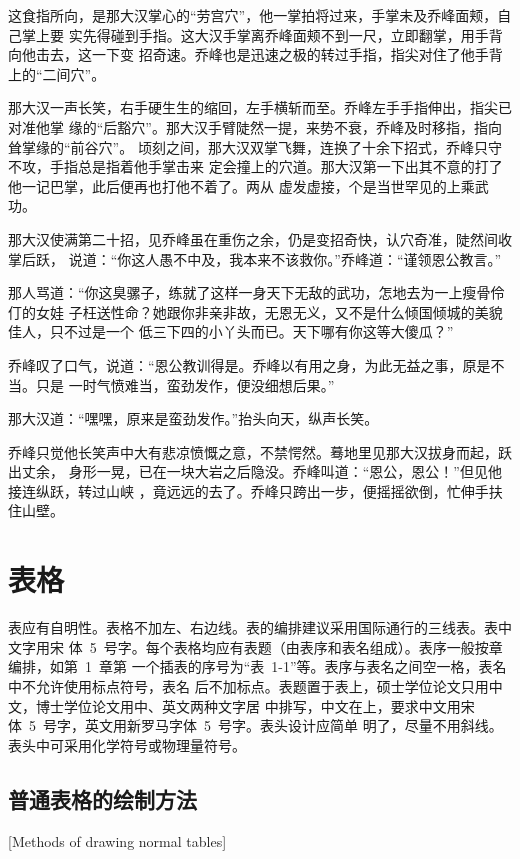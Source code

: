 这食指所向，是那大汉掌心的“劳宫穴”，他一掌拍将过来，手掌未及乔峰面颊，自己掌上要
实先得碰到手指。这大汉手掌离乔峰面颊不到一尺，立即翻掌，用手背向他击去，这一下变
招奇速。乔峰也是迅速之极的转过手指，指尖对住了他手背上的“二间穴”。

那大汉一声长笑，右手硬生生的缩回，左手横斩而至。乔峰左手手指伸出，指尖已对准他掌
缘的“后豁穴”。那大汉手臂陡然一提，来势不衰，乔峰及时移指，指向耸掌缘的“前谷穴”。
顷刻之间，那大汉双掌飞舞，连换了十余下招式，乔峰只守不攻，手指总是指着他手掌击来
定会撞上的穴道。那大汉第一下出其不意的打了他一记巴掌，此后便再也打他不着了。两从
虚发虚接，个是当世罕见的上乘武功。

那大汉使满第二十招，见乔峰虽在重伤之余，仍是变招奇快，认穴奇准，陡然间收掌后跃，
说道：“你这人愚不中及，我本来不该救你。”乔峰道：“谨领恩公教言。”

那人骂道：“你这臭骡子，练就了这样一身天下无敌的武功，怎地去为一上瘦骨伶仃的女娃
子枉送性命？她跟你非亲非故，无恩无义，又不是什么倾国倾城的美貌佳人，只不过是一个
低三下四的小丫头而已。天下哪有你这等大傻瓜？”

乔峰叹了口气，说道：“恩公教训得是。乔峰以有用之身，为此无益之事，原是不当。只是
一时气愤难当，蛮劲发作，便没细想后果。”

那大汉道：“嘿嘿，原来是蛮劲发作。”抬头向天，纵声长笑。

乔峰只觉他长笑声中大有悲凉愤慨之意，不禁愕然。蓦地里见那大汉拔身而起，跃出丈余，
身形一晃，已在一块大岩之后隐没。乔峰叫道：“恩公，恩公！”但见他接连纵跃，转过山峡
，竟远远的去了。乔峰只跨出一步，便摇摇欲倒，忙伸手扶住山壁。

\section{表格}

表应有自明性。表格不加左、右边线。表的编排建议采用国际通行的三线表。表中文字用宋
体~5~号字。每个表格均应有表题（由表序和表名组成）。表序一般按章编排，如第~1~章第
一个插表的序号为“表~1-1”等。表序与表名之间空一格，表名中不允许使用标点符号，表名
后不加标点。表题置于表上，硕士学位论文只用中文，博士学位论文用中、英文两种文字居
中排写，中文在上，要求中文用宋体~5~号字，英文用新罗马字体~5~号字。表头设计应简单
明了，尽量不用斜线。表头中可采用化学符号或物理量符号。


\subsection{普通表格的绘制方法}[Methods of drawing normal tables]

